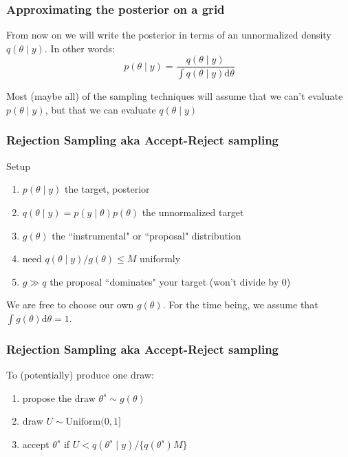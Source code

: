 \documentclass{beamer}
\begin{document}
\begin{frame}[fragile]
\frametitle{Approximating the posterior on a grid}

From now on we will write the posterior in terms of an unnormalized density $q(\theta \mid y)$. In other words:
\[
p(\theta \mid y) = \frac{q(\theta \mid y)}{ \int q(\theta \mid y) \text{d}\theta}
\]

Most (maybe all) of the sampling techniques will assume that we can't evaluate $p(\theta \mid y)$, but that we can evaluate $q(\theta \mid y)$

\end{frame}
\begin{frame}[fragile]
\frametitle{Rejection Sampling aka Accept-Reject sampling}

Setup
\begin{enumerate}
\item $p(\theta \mid y)$ the target, posterior
\item $q(\theta \mid y) = p(y \mid \theta) p(\theta)$ the unnormalized target
\item $g(\theta)$ the ``instrumental" or ``proposal" distribution
\item need $q(\theta \mid y) / g(\theta) \le M$ uniformly
\item $g \gg q$ the proposal ``dominates" your target (won't divide by $0$)
\end{enumerate}
We are free to choose our own $g(\theta)$. For the time being, we assume that $\int g(\theta) \text{d}\theta = 1$.

\end{frame}
\begin{frame}[fragile]
\frametitle{Rejection Sampling aka Accept-Reject sampling}


To (potentially) produce one draw:
\begin{enumerate}
\item propose the draw $\theta^s \sim g(\theta)$
\item draw $U \sim \text{Uniform}(0,1]$
\item accept $\theta^s$ if $U < q(\theta^s \mid y) / \{ q(\theta^s)  M\}$
\end{enumerate}


\end{frame}
\end{document}
